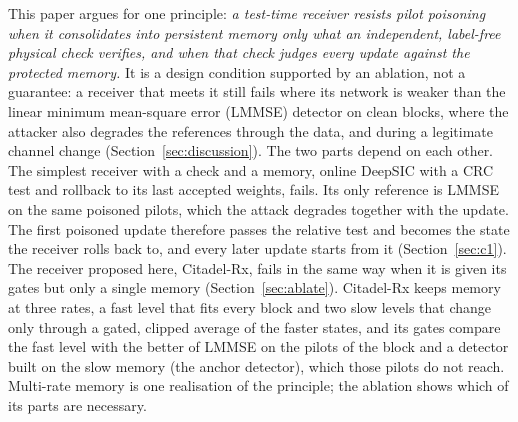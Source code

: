 \documentclass[journal]{IEEEtran}
\theoremstyle{remark}
\begin{document}
This paper argues for one principle: \emph{a test-time receiver resists pilot poisoning when it
consolidates into persistent memory only what an independent, label-free physical check
verifies, and when that check judges every update against the protected memory.} It is a design condition supported by an ablation, not a guarantee: a receiver that meets it still fails where its network is weaker than the linear minimum mean-square error (LMMSE) detector on clean blocks, where the attacker also degrades the references through the data, and during a legitimate channel change (Section~\ref{sec:discussion}). The two parts
depend on each other. The simplest receiver with a check and a memory, online DeepSIC with a CRC test and rollback to its last accepted weights, fails. Its only reference is LMMSE on the same poisoned pilots, which the attack degrades together with the update. The first poisoned update therefore passes the relative test and becomes the state the receiver rolls back to, and every later update starts from it (Section~\ref{sec:c1}). The receiver proposed here, Citadel-Rx, fails in the same way when it is given its gates but only a single memory (Section~\ref{sec:ablate}). Citadel-Rx keeps memory at three rates, a fast level that
fits every block and two slow levels that change only through a gated, clipped average of the
faster states, and its gates compare the fast level with the better of LMMSE on the pilots of the
block and a detector built on the slow memory (the anchor detector), which those pilots do not reach. Multi-rate memory is one realisation of the principle;
the ablation shows which of its parts are necessary.
\end{document}
